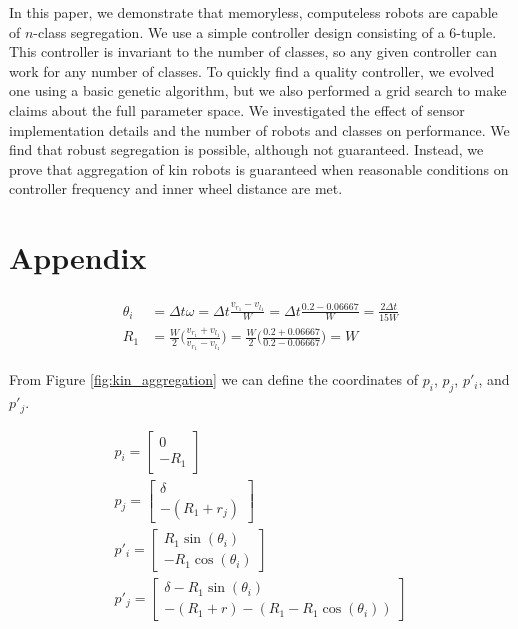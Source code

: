 \documentclass[conference]{IEEEtran}
\begin{document}
  In this paper, we demonstrate that memoryless, computeless robots are capable of $n$-class segregation. We use a simple controller design consisting of a 6-tuple. This controller is invariant to the number of classes, so any given controller can work for any number of classes. To quickly find a quality controller, we evolved one using a basic genetic algorithm, but we also performed a grid search to make claims about the full parameter space. We investigated the effect of sensor implementation details and the number of robots and classes on performance. We find that robust segregation is possible, although not guaranteed. Instead, we prove that aggregation of kin robots is guaranteed when reasonable conditions on controller frequency and inner wheel distance are met.




\onecolumn
\appendix
\section{Appendix}

    \begin{align}
      \begin{split} \label{eq:theta_and_r}
        \theta_i &= \Delta t\omega = \Delta t \frac{v_{r_1} - v_{l_1}}{W} = \Delta t \frac{0.2 - 0.06667}{W} = \frac{2\Delta t}{15W} \\
        R_1 &= \frac{W}{2}\bigg(\frac{v_{r_1} + v_{l_1}}{v_{r_1} - v_{l_1}}\bigg) = \frac{W}{2}\bigg(\frac{0.2 + 0.06667}{0.2 - 0.06667}\bigg) = W
      \end{split}
    \end{align}

    From Figure \ref{fig:kin_aggregation} we can define the coordinates of $p_i$, $p_j$, $p'_i$, and $p'_j$.

    \begin{equation} \label{eq:two_kin_vars_1}
      \begin{split}
        p_i = \begin{bmatrix}0 \\ -R_1\end{bmatrix} \\
        p_j = \begin{bmatrix}\delta \\ -(R_1+r_j)\end{bmatrix} \\
        p'_i = \begin{bmatrix}R_1\sin(\theta_i) \\ -R_1\cos(\theta_i)\end{bmatrix} \\
        p'_j = \begin{bmatrix}\delta - R_1\sin(\theta_i) \\ -(R_1+r) - (R_1-R_1\cos(\theta_i))\end{bmatrix} \\
      \end{split}
    \end{equation}
\end{document}
